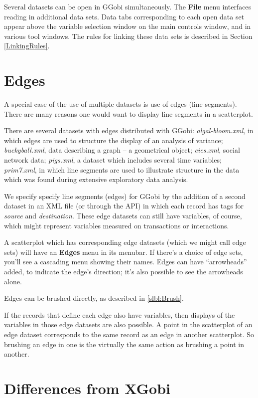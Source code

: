 \documentclass[11pt]{article}
\begin{document}
Several datasets can be open in GGobi simultaneously. The {\bf File}
menu interfaces reading in additional data sets. Data tabs corresponding
to each open data set appear above the variable selection window on
the main controls window, and in various tool windows. The rules for
linking these data sets is described in Section \ref{LinkingRules}.

\section{Edges}

A special case of the use of multiple datasets is use of edges (line
segments).  There are many reasons one would want to display line segments
in a scatterplot. 

There are several datasets with edges distributed with GGobi: {\em
algal-bloom.xml}, in which edges are used to structure the display of an
analysis of variance; {\em buckyball.xml}, data describing a graph -- a
geometrical object; {\em eies.xml}, social network data; {\em pigs.xml},
a dataset which includes several time variables; {\em prim7.xml},
in which line segments are used to illustrate structure in the
data which was found during extensive exploratory data analysis.

We specify specify line segments (edges) for GGobi by the addition of a
second dataset in an XML file (or through the API) in which each record
has tags for {\it source} and {\it destination}.  These edge datasets
can still have variables, of course, which might represent variables
measured on transactions or interactions.

A scatterplot which has corresponding edge datasets (which we might call
edge sets) will have an {\bf Edges} menu in its menubar.  If there's a
choice of edge sets, you'll see a cascading menu showing their names.
Edges can have ``arrowheads'' added, to indicate the edge's direction;
it's also possible to see the arrowheads alone.

Edges can be brushed directly, as described in \ref{slbl:Brush}.

If the records that define each edge also have variables, then
displays of the variables in those edge datasets are also possible.
A point in the scatterplot of an edge dataset corresponds to the
same record as an edge in another scatterplot.  So brushing an
edge in one is the virtually the same action as brushing a point
in another.

\newpage
\section{Differences from XGobi}
\label{slbl:xgobi}
\end{document}
